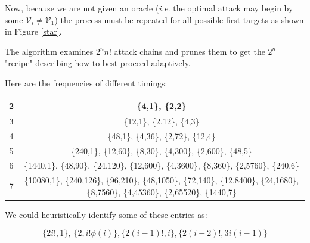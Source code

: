 \documentclass[11pt]{llncs}
\begin{document}
Now, because we are not given an oracle ({\sl i.e.} the optimal attack may begin by some $\mathcal{V}_i\neq\mathcal{V}_1$) the process must be repeated for all possible first targets as shown in Figure \ref{star}.\smallskip

The algorithm examines $2^n n!$ attack chains and prunes them to get the $2^n$ "recipe" describing how to best proceed adaptively.\smallskip

Here are the frequencies of different timings:

\begin{center}
{\small
\begin{tabular}{c|c}\hline
2 & \{4,1\}, \{2,2\}\\\hline
3 & \{12,1\}, \{2,12\}, \{4,3\}\\\hline
4 &\{48,1\}, \{4,36\}, \{2,72\}, \{12,4\}\\\hline
5 &\{240,1\}, \{12,60\}, \{8,30\}, \{4,300\}, \{2,600\}, \{48,5\}\\\hline
6 &\{1440,1\}, \{48,90\}, \{24,120\}, \{12,600\}, \{4,3600\}, \{8,360\}, \{2,5760\}, \{240,6\}\\\hline
7 &\{10080,1\}, \{240,126\}, \{96,210\}, \{48,1050\}, \{72,140\}, \{12,8400\}, \{24,1680\}, \{8,7560\}, \{4,45360\}, \{2,65520\}, \{1440,7\}\\\hline
\end{tabular}}
\end{center}

We could heuristically identify some of these entries as:

$$\{2 i!, 1\},~\{2, i! \phi(i)\},\{2(i-1)!,i\},\{2(i-2)!, 3i(i-1)\}$$
\end{document}
